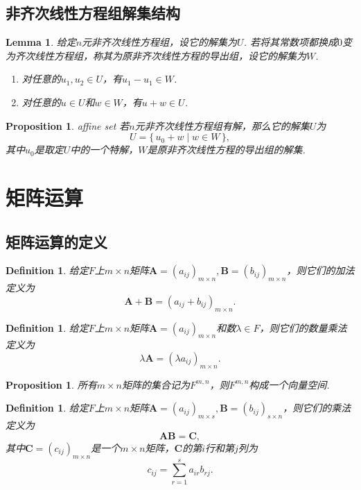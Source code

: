 \documentclass{article}
\newtheorem{lemma}[theorem]{Lemma}
\newtheorem{proposition}[theorem]{Proposition}
\newtheorem{definition}[theorem]{Definition}
\newcommand\Set[2]{\{\,#1\mid#2\,\}} %
\newcommand{\mbf}[1]{\bm{#1}}
\begin{document}
\subsection{非齐次线性方程组解集结构}

\begin{lemma}
\rm 给定$n$元非齐次线性方程组，设它的解集为$U$. 若将其常数项都换成$0$变为齐次线性方程组，称其为原非齐次线性方程的导出组，设它的解集为$W$. 
\begin{enumerate}
	\item 对任意的$u_1, u_2 \in U$，有$u_1-u_1 \in W$.
	\item 对任意的$u \in U$和$w \in W$，有$u+w \in U$.
\end{enumerate}
\end{lemma}

\begin{proposition}
\rm {\color{red} affine set} 若$n$元非齐次线性方程组有解，那么它的解集$U$为
$$
U = \Set{u_0 + w}{ w \in W},
$$
其中$u_0$是取定$U$中的一个特解，$W$是原非齐次线性方程的导出组的解集. 
\end{proposition}

\newpage
\section{矩阵运算}

\subsection{矩阵运算的定义}

\begin{definition}
\rm 给定$F$上$m \times n$矩阵$\mbf{A}=(a_{ij})_{m \times n},\mbf{B}=(b_{ij})_{m \times n}$，则它们的加法定义为
$$
\mbf{A} + \mbf{B} = (a_{ij} + b_{ij})_{m \times n}.
$$
\end{definition}

\begin{definition}
\rm 给定$F$上$m\times n$矩阵$\mbf{A}=(a_{ij})_{m \times n}$和数$\lambda \in F$，则它们的数量乘法定义为
$$
\lambda\mbf{A} = (\lambda a_{ij})_{m \times n}.
$$
\end{definition}


\begin{proposition}
\rm 所有$m \times n$矩阵的集合记为$F^{m,n}$，则$F^{m,n}$构成一个向量空间.
\end{proposition}

\begin{definition}
\rm 给定$F$上$m \times n$矩阵$\mbf{A}=(a_{ij})_{m \times s},\mbf{B}=(b_{ij})_{s \times n}$，则它们的乘法定义为
$$
\mbf{A}\mbf{B} = \mbf{C},
$$
其中$\mbf{C}=(c_{ij})_{m\times n}$是一个$m \times n$矩阵，$\mbf{C}$的第$i$行和第$j$列为
$$
c_{ij} = \sum\limits_{r=1}^{s} a_{ir}b_{rj}. 
$$
\end{definition}
\end{document}

